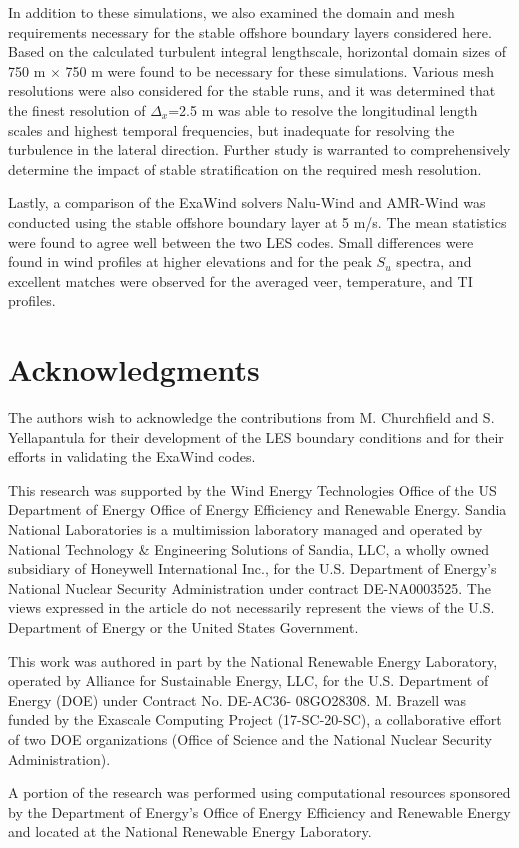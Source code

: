 \documentclass[conf]{new-aiaa}
\begin{document}
In addition to these simulations, we also examined the domain and mesh
requirements necessary for the stable offshore boundary layers
considered here.  Based on the calculated turbulent integral
lengthscale, horizontal domain sizes of 750 m $\times$ 750 m were found
to be necessary for these simulations.  Various mesh resolutions were
also considered for the stable runs, and it was determined that the
finest resolution of $\Delta_x$=2.5 m was able to resolve the longitudinal
length scales and highest temporal frequencies, but inadequate for
resolving the turbulence in the lateral direction.  Further study is
warranted to comprehensively determine the impact of stable
stratification on the required mesh resolution.

Lastly, a comparison of the ExaWind solvers Nalu-Wind and AMR-Wind was
conducted using the stable offshore boundary layer at 5 m/s.  The mean
statistics were found to agree well between the two LES codes.  Small
differences were found in wind profiles at higher elevations and for
the peak $S_u$ spectra, and excellent matches were observed for the
averaged veer, temperature, and TI profiles.



\section*{Acknowledgments}

The authors wish to acknowledge the contributions from M. Churchfield
and S. Yellapantula for their development of the LES boundary
conditions and for their efforts in validating the ExaWind codes.

This research was supported by the Wind Energy Technologies Office of
the US Department of Energy Office of Energy Efficiency and Renewable
Energy.  Sandia National Laboratories is a multimission laboratory
managed and operated by National Technology \& Engineering Solutions
of Sandia, LLC, a wholly owned subsidiary of Honeywell International
Inc., for the U.S. Department of Energy's National Nuclear Security
Administration under contract DE-NA0003525. The views expressed in the
article do not necessarily represent the views of the U.S. Department
of Energy or the United States Government.

This work was authored in part by the National Renewable Energy
Laboratory, operated by Alliance for Sustainable Energy, LLC, for the
U.S. Department of Energy (DOE) under Contract No. DE-AC36-
08GO28308. M. Brazell was funded by the Exascale Computing
Project (17-SC-20-SC), a collaborative effort of two DOE organizations
(Office of Science and the National Nuclear Security Administration).

A portion of the research was performed using computational
resources sponsored by the Department of Energy's Office of Energy
Efficiency and Renewable Energy and located at the National Renewable
Energy Laboratory.


\end{document}

